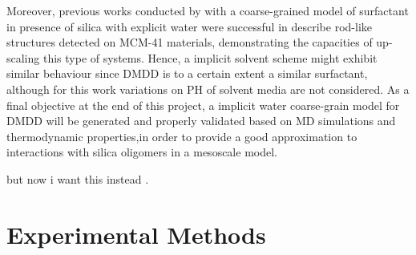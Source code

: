 \documentclass[10pt,a4paper,twoside]{article}
\begin{document}
Moreover, previous works conducted by \cite{mjsilica} with a coarse-grained model of surfactant in presence of silica with explicit water were successful in describe rod-like structures detected on MCM-41 materials, demonstrating the capacities of up-scaling this type of systems. Hence, a implicit solvent scheme might exhibit similar behaviour since DMDD is to a certain extent a similar surfactant, although for this work variations on PH of solvent media are not considered. As a final objective at the end of this project, a implicit water coarse-grain model for DMDD will be generated and properly validated based on MD simulations and thermodynamic properties,in order to provide a good approximation to interactions with silica oligomers in a mesoscale model.



but now i want this instead .

\section{Experimental Methods}
\end{document}
